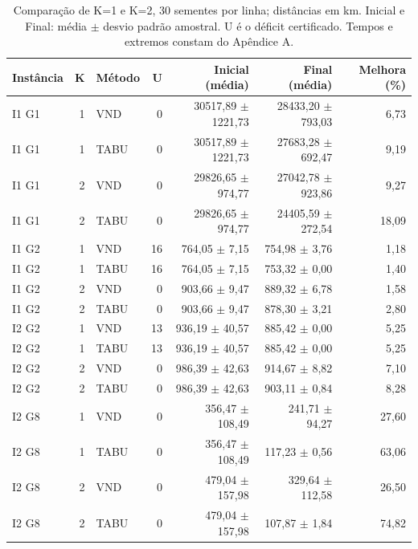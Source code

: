 \begin{table}[ht]
\centering\small
\setlength{\tabcolsep}{3pt}
\caption{Comparação de K=1 e K=2, 30 sementes por linha; distâncias em km. Inicial e Final: média $\pm$ desvio padrão amostral. U é o déficit certificado. Tempos e extremos constam do Apêndice A.}
\begin{tabular}{lrlrrrr}
\toprule Instância & K & Método & U & Inicial (média) & Final (média) & Melhora (\%)\\\midrule
I1 G1 & 1 & VND & 0 & 30517,89 $\pm$ 1221,73 & 28433,20 $\pm$ 793,03 & 6,73 \\
I1 G1 & 1 & TABU & 0 & 30517,89 $\pm$ 1221,73 & 27683,28 $\pm$ 692,47 & 9,19 \\
I1 G1 & 2 & VND & 0 & 29826,65 $\pm$ 974,77 & 27042,78 $\pm$ 923,86 & 9,27 \\
I1 G1 & 2 & TABU & 0 & 29826,65 $\pm$ 974,77 & 24405,59 $\pm$ 272,54 & 18,09 \\
I1 G2 & 1 & VND & 16 & 764,05 $\pm$ 7,15 & 754,98 $\pm$ 3,76 & 1,18 \\
I1 G2 & 1 & TABU & 16 & 764,05 $\pm$ 7,15 & 753,32 $\pm$ 0,00 & 1,40 \\
I1 G2 & 2 & VND & 0 & 903,66 $\pm$ 9,47 & 889,32 $\pm$ 6,78 & 1,58 \\
I1 G2 & 2 & TABU & 0 & 903,66 $\pm$ 9,47 & 878,30 $\pm$ 3,21 & 2,80 \\
I2 G2 & 1 & VND & 13 & 936,19 $\pm$ 40,57 & 885,42 $\pm$ 0,00 & 5,25 \\
I2 G2 & 1 & TABU & 13 & 936,19 $\pm$ 40,57 & 885,42 $\pm$ 0,00 & 5,25 \\
I2 G2 & 2 & VND & 0 & 986,39 $\pm$ 42,63 & 914,67 $\pm$ 8,82 & 7,10 \\
I2 G2 & 2 & TABU & 0 & 986,39 $\pm$ 42,63 & 903,11 $\pm$ 0,84 & 8,28 \\
I2 G8 & 1 & VND & 0 & 356,47 $\pm$ 108,49 & 241,71 $\pm$ 94,27 & 27,60 \\
I2 G8 & 1 & TABU & 0 & 356,47 $\pm$ 108,49 & 117,23 $\pm$ 0,56 & 63,06 \\
I2 G8 & 2 & VND & 0 & 479,04 $\pm$ 157,98 & 329,64 $\pm$ 112,58 & 26,50 \\
I2 G8 & 2 & TABU & 0 & 479,04 $\pm$ 157,98 & 107,87 $\pm$ 1,84 & 74,82 \\
\bottomrule\end{tabular}
\end{table}